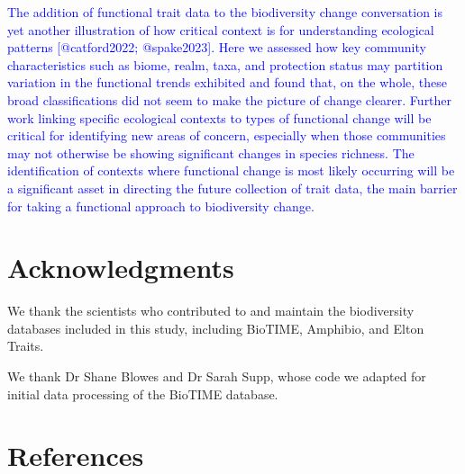 \documentclass{article}
\begin{document}
\textcolor{blue}{The addition of functional trait data to the biodiversity change conversation is yet another illustration of how critical context is for understanding ecological patterns [@catford2022; @spake2023]. Here we assessed how key community characteristics such as biome, realm, taxa, and protection status may partition variation in the functional trends exhibited and found that, on the whole, these broad classifications did not seem to make the picture of change clearer. Further work linking specific ecological contexts to types of functional change will be critical for identifying new areas of concern, especially when those communities may not otherwise be showing significant changes in species richness. The identification of contexts where functional change is most likely occurring will be a significant asset in directing the future collection of trait data, the main barrier for taking a functional approach to biodiversity change.}

\hypertarget{acknowledgments}{%
\section{Acknowledgments}\label{acknowledgments}}

We thank the scientists who contributed to and maintain the biodiversity
databases included in this study, including BioTIME, Amphibio, and Elton
Traits.

We thank Dr Shane Blowes and Dr Sarah Supp, whose code we adapted for
initial data processing of the BioTIME database.

\hypertarget{references}{%
\section*{References}\label{references}}
\end{document}
